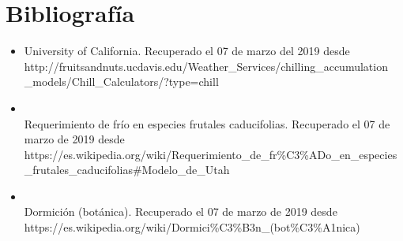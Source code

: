 \documentclass[letterpaper,12pt]{article}
\begin{document}
\section*{Bibliografía}
\begin{itemize}
\item University of California. Recuperado el 07 de marzo del 2019 desde \\http://fruitsandnuts.ucdavis.edu/Weather\_Services/chilling\_accumulation
\\
\_models/Chill\_Calculators/?type=chill
\item \\Requerimiento de frío en especies frutales caducifolias. Recuperado el 07 de marzo de 2019 desde \\https://es.wikipedia.org/wiki/Requerimiento\_de\_fr\%C3\%ADo\_en\_especies
\\
\_frutales\_caducifolias#Modelo\_de\_Utah
\item \\Dormición (botánica). Recuperado el 07 de marzo de 2019 desde \\https://es.wikipedia.org/wiki/Dormici\%C3\%B3n\_(bot\%C3\%A1nica)
\end{itemize}
\end{document}
